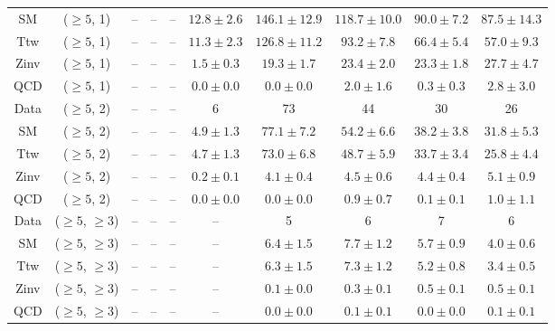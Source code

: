\begin{table}[h!]
{\begin{tabular}{cccccccccc}
	SM & ($\ge5$, 1) & -- & -- & -- & $12.8\pm 2.6$ & $146.1\pm 12.9$ & $118.7\pm 10.0$ & $90.0\pm 7.2$ & $87.5\pm 14.3$ \\[0.5ex] 
	Ttw & ($\ge5$, 1) & -- & -- & -- & $11.3\pm 2.3$ & $126.8\pm 11.2$ & $93.2\pm 7.8$ & $66.4\pm 5.4$ & $57.0\pm 9.3$ \\[0.5ex] 
	Zinv & ($\ge5$, 1) & -- & -- & -- & $1.5\pm 0.3$ & $19.3\pm 1.7$ & $23.4\pm 2.0$ & $23.3\pm 1.8$ & $27.7\pm 4.7$ \\[0.5ex] 
	QCD & ($\ge5$, 1) & -- & -- & -- & $0.0\pm 0.0$ & $0.0\pm 0.0$ & $2.0\pm 1.6$ & $0.3\pm 0.3$ & $2.8\pm 3.0$ \\[0.5ex] 
	Data & ($\ge5$, 2) & -- & -- & -- & 6 & 73 & 44 & 30 & 26 \\[0.5ex] 
	SM & ($\ge5$, 2) & -- & -- & -- & $4.9\pm 1.3$ & $77.1\pm 7.2$ & $54.2\pm 6.6$ & $38.2\pm 3.8$ & $31.8\pm 5.3$ \\[0.5ex] 
	Ttw & ($\ge5$, 2) & -- & -- & -- & $4.7\pm 1.3$ & $73.0\pm 6.8$ & $48.7\pm 5.9$ & $33.7\pm 3.4$ & $25.8\pm 4.4$ \\[0.5ex] 
	Zinv & ($\ge5$, 2) & -- & -- & -- & $0.2\pm 0.1$ & $4.1\pm 0.4$ & $4.5\pm 0.6$ & $4.4\pm 0.4$ & $5.1\pm 0.9$ \\[0.5ex] 
	QCD & ($\ge5$, 2) & -- & -- & -- & $0.0\pm 0.0$ & $0.0\pm 0.0$ & $0.9\pm 0.7$ & $0.1\pm 0.1$ & $1.0\pm 1.1$ \\[0.5ex] 
	Data & ($\ge5$, $\ge3$) & -- & -- & -- & -- & 5 & 6 & 7 & 6 \\[0.5ex] 
	SM & ($\ge5$, $\ge3$) & -- & -- & -- & -- & $6.4\pm 1.5$ & $7.7\pm 1.2$ & $5.7\pm 0.9$ & $4.0\pm 0.6$ \\[0.5ex] 
	Ttw & ($\ge5$, $\ge3$) & -- & -- & -- & -- & $6.3\pm 1.5$ & $7.3\pm 1.2$ & $5.2\pm 0.8$ & $3.4\pm 0.5$ \\[0.5ex] 
	Zinv & ($\ge5$, $\ge3$) & -- & -- & -- & -- & $0.1\pm 0.0$ & $0.3\pm 0.1$ & $0.5\pm 0.1$ & $0.5\pm 0.1$ \\[0.5ex] 
	QCD & ($\ge5$, $\ge3$) & -- & -- & -- & -- & $0.0\pm 0.0$ & $0.1\pm 0.1$ & $0.0\pm 0.0$ & $0.1\pm 0.1$ \\[0.5ex] 
	\hline
	\hline
\end{tabular}}
\end{table}
